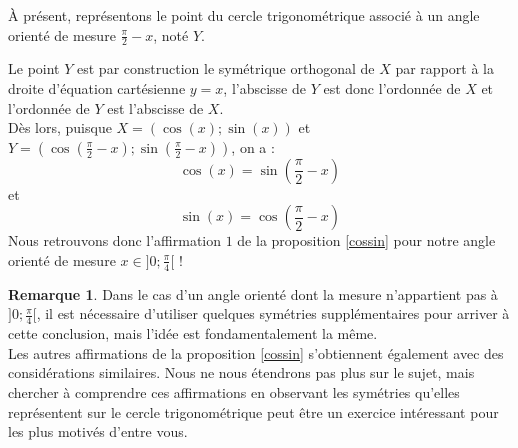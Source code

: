 \documentclass[a4paper,fontsize=13pt]{scrreprt}
\theoremstyle{plain}
\theoremstyle{definition}
\newtheorem{rema}[subsection]{Remarque}
\newcommand {\axes} {
	\draw[thick, ->] (\xmin,0) -- (\xmax+1,0);
	\draw[thick, ->] (0,\ymin) -- (0,\ymax+1);
	\draw (0,\ymax+0.5) node [left] {$y$};
	\draw (\xmax+0.5, 0) node [below] {$x$};
	\draw[thick] (-0.15,1)--(0.15,1) (1,-0.15)--(1,0.15);
	\draw (0,1)node[left]{$1$} (1,0)node[below]{$1$};
}
\begin{document}
\begin{center}
\end{center}
\`A présent, représentons le point du cercle trigonométrique associé à un angle orienté de mesure $\frac{\pi}{2}-x$, noté $Y$.
\begin{center}
\end{center}
Le point $Y$ est par construction le symétrique orthogonal de $X$ par rapport à la droite d'équation cartésienne $y=x$, l'abscisse de $Y$ est donc l'ordonnée de $X$ et l'ordonnée de $Y$ est l'abscisse de $X$. \\
Dès lors, puisque $X=(\cos(x);\sin(x))$ et $Y=(\cos(\frac{\pi}{2}-x);\sin(\frac{\pi}{2}-x))$, on a :
$$\cos(x) = \sin(\frac{\pi}{2}-x)$$
et
$$\sin(x) = \cos(\frac{\pi}{2}-x)$$
Nous retrouvons donc l'affirmation $1$ de la proposition \ref{cossin} pour notre angle orienté de mesure $x \in ]0;\frac{\pi}{4}[$ !
\begin{rema}
Dans le cas d'un angle orienté dont la mesure n'appartient pas à $]0;\frac{\pi}{4}[$, il est nécessaire d'utiliser quelques symétries supplémentaires pour arriver à cette conclusion, mais l'idée est fondamentalement la même. \\
Les autres affirmations de la proposition \ref{cossin} s'obtiennent également avec des considérations similaires. Nous ne nous étendrons pas plus sur le sujet, mais chercher à comprendre ces affirmations en observant les symétries qu'elles représentent sur le cercle trigonométrique peut être un exercice intéressant pour les plus motivés d'entre vous.
\end{rema}
\end{document}
